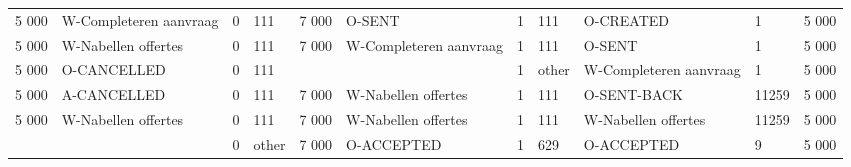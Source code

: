 \begin{tabular}{llllllllllr}
5 000 & W-Completeren aanvraag & 0 & 111 & 7 000 & O-SENT & 1 & 111 & O-CREATED & 1 & 5 000 \\
5 000 & W-Nabellen offertes & 0 & 111 & 7 000 & W-Completeren aanvraag & 1 & 111 & O-SENT & 1 & 5 000 \\
5 000 & O-CANCELLED & 0 & 111 &  &  & 1 & other & W-Completeren aanvraag & 1 & 5 000 \\
5 000 & A-CANCELLED & 0 & 111 & 7 000 & W-Nabellen offertes & 1 & 111 & O-SENT-BACK & 11259 & 5 000 \\
5 000 & W-Nabellen offertes & 0 & 111 & 7 000 & W-Nabellen offertes & 1 & 111 & W-Nabellen offertes & 11259 & 5 000 \\
 &  & 0 & other & 7 000 & O-ACCEPTED & 1 & 629 & O-ACCEPTED & 9 & 5 000 \\
\bottomrule
\end{tabular}
